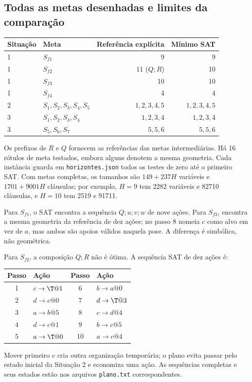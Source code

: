 \documentclass[11pt,a4paper]{article}
\begin{document}
\subsection{Todas as metas desenhadas e limites da comparação}
\begin{center}\small
\begin{tabular}{@{}llrr@{}}\toprule
Situação & Meta & Referência explícita & Mínimo SAT\\\midrule
1 & $S_{f1}$ & 9 & 9\\
1 & $S_{f2}$ & 11 ($Q;R$) & 10\\
1 & $S_{f3}$ & 10 & 10\\
1 & $S_{f4}$ & 4 & 4\\\midrule
2 & $S_1,S_2,S_3,S_4,S_5$ & $1,2,3,4,5$ & $1,2,3,4,5$\\\midrule
3 & $S_1,S_2,S_3,S_4$ & $1,2,3,4$ & $1,2,3,4$\\
3 & $S_5,S_6,S_7$ & $5,5,6$ & $5,5,6$\\\bottomrule
\end{tabular}\end{center}
Os prefixos de $R$ e $Q$ fornecem as referências das metas intermediárias. Há 16 rótulos de meta testados, embora alguns denotem a mesma geometria. Cada instância guarda em \texttt{horizontes.json} todos os testes de zero até o primeiro SAT. Com metas completas, os tamanhos são $149+237H$ variáveis e $1701+9001H$ cláusulas; por exemplo, $H=9$ tem 2282 variáveis e 82710 cláusulas, e $H=10$ tem 2519 e 91711.

Para $S_{f1}$, o SAT encontra a sequência $Q;u;v;w$ de nove ações. Para $S_{f3}$, encontra a mesma geometria da referência de dez ações; no passo 8 nomeia $c$ como alvo em vez de $a$, mas ambos são apoios válidos naquela pose. A diferença é simbólica, não geométrica.

Para $S_{f2}$, a composição $Q;R$ não é ótima. A sequência SAT de dez ações é:
\begin{center}\small
\begin{tabular}{@{}clcl@{}}\toprule
Passo & Ação & Passo & Ação\\\midrule
1 & $c\to\T@1$ & 6 & $b\to a@0$\\
2 & $d\to c@0$ & 7 & $d\to\T@3$\\
3 & $a\to b@5$ & 8 & $c\to d@4$\\
4 & $d\to c@1$ & 9 & $b\to c@5$\\
5 & $a\to\T@0$ & 10 & $a\to c@4$\\\bottomrule
\end{tabular}\end{center}
Mover primeiro $c$ cria outra organização temporária; o plano evita passar pelo estado inicial da Situação 2 e economiza uma ação. As sequências completas e seus estados estão nos arquivos \texttt{plano.txt} correspondentes.
\end{document}
